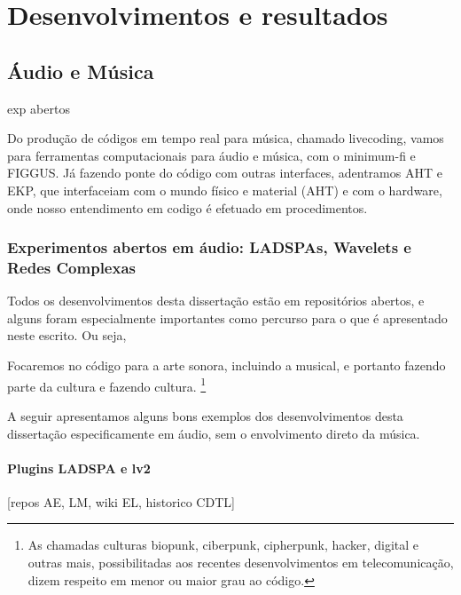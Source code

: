 \chapter{Desenvolvimentos e resultados} %
\label{cap:resultados} %


\section{Áudio e Música}

exp abertos

Do produção de códigos em tempo real para música, chamado livecoding,
vamos para ferramentas computacionais para áudio e música, com o minimum-fi
e FIGGUS. Já fazendo ponte do código com outras interfaces, adentramos AHT e EKP,
que interfaceiam com o mundo físico e material (AHT) e com o hardware, onde
nosso entendimento em codigo é efetuado em procedimentos.

  \subsection{Experimentos abertos em áudio: LADSPAs, Wavelets e Redes Complexas}

Todos os desenvolvimentos desta dissertação estão em repositórios abertos\cite{repositorios-tese-dev},
e alguns foram especialmente importantes como percurso para o que é apresentado neste
escrito. Ou seja, 

Focaremos no código para a arte sonora,
incluindo a musical, e portanto fazendo parte da cultura e fazendo cultura.
\footnote{As chamadas culturas biopunk, ciberpunk, cipherpunk, hacker, digital e outras mais,
possibilitadas aos recentes desenvolvimentos em telecomunicação, dizem respeito em menor
ou maior grau ao código.}

A seguir apresentamos alguns bons exemplos dos desenvolvimentos
desta dissertação especificamente em áudio, sem o envolvimento direto da música.

      \subsubsection{Plugins LADSPA e lv2}
      [repos AE, LM, wiki EL, historico CDTL]


